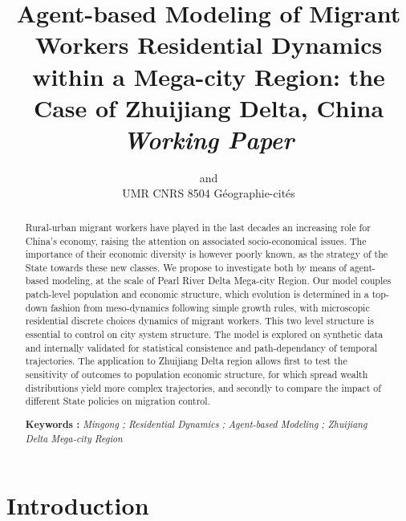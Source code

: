 


\title{Agent-based Modeling of Migrant Workers Residential Dynamics within a Mega-city Region: the Case of Zhuijiang Delta, China
\bigskip\\
\textit{Working Paper}
}
\author{ and \\
UMR CNRS 8504 Géographie-cités
}
\date{}


\maketitle

\justify


\begin{abstract}
Rural-urban migrant workers have played in the last decades an increasing role for China's economy, raising the attention on associated socio-economical issues. The importance of their economic diversity is however poorly known, as the strategy of the State towards these new classes. We propose to investigate both by means of agent-based modeling, at the scale of Pearl River Delta Mega-city Region. Our model couples patch-level population and economic structure, which evolution is determined in a top-down fashion from meso-dynamics following simple growth rules, with microscopic residential discrete choices dynamics of migrant workers. This two level structure is essential to control on city system structure. The model is explored on synthetic data and internally validated for statistical consistence and path-dependancy of temporal trajectories. The application to Zhuijiang Delta region allows first to test the sensitivity of outcomes to population economic structure, for which spread wealth distributions yield more complex trajectories, and secondly to compare the impact of different State policies on migration control.

\bigskip

\noindent\textbf{Keywords : } \textit{Mingong ; Residential Dynamics ; Agent-based Modeling ; Zhuijiang Delta Mega-city Region}
\end{abstract}




\section{Introduction}



